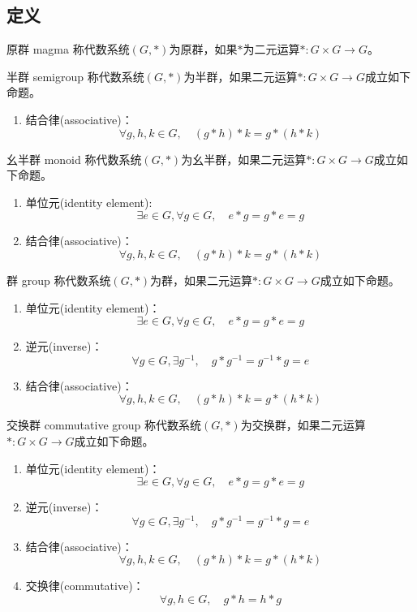 \subsection{定义}

\begin{definition}{原群 magma}
	称代数系统$(G,*)$为原群，如果$*$为二元运算$*:G\times G\to G$。
\end{definition}

\begin{definition}{半群 semigroup}
	称代数系统$(G,*)$为半群，如果二元运算$*:G\times G\to G$成立如下命题。
	\begin{enumerate}
		\item 结合律(associative)：
		$$
		\forall g,h,k\in G,\quad (g*h)*k=g*(h*k)
		$$
	\end{enumerate}
\end{definition}

\begin{definition}{幺半群 monoid}
	称代数系统$(G,*)$为幺半群，如果二元运算$*:G\times G\to G$成立如下命题。
	\begin{enumerate}
		\item 单位元(identity element):
		$$
		\exists e\in G,\forall g\in G,\quad e*g=g*e=g
		$$
		\item 结合律(associative)：
		$$
		\forall g,h,k\in G,\quad (g*h)*k=g*(h*k)
		$$
	\end{enumerate}
\end{definition}

\begin{definition}{群 group}
	称代数系统$(G,*)$为群，如果二元运算$*:G\times G\to G$成立如下命题。
	\begin{enumerate}
		\item 单位元(identity element)：
		$$
		\exists e\in G,\forall g\in G,\quad e*g=g*e=g
		$$
		\item 逆元(inverse)：$$
		\forall g\in G,\exists g^{-1},\quad g*g^{-1}=g^{-1}*g=e
		$$
		\item 结合律(associative)：
		$$
		\forall g,h,k\in G,\quad (g*h)*k=g*(h*k)
		$$
	\end{enumerate}
\end{definition}

\begin{definition}{交换群 commutative group}
	称代数系统$(G,*)$为交换群，如果二元运算$*:G\times G\to G$成立如下命题。
	\begin{enumerate}
		\item 单位元(identity element)：
		$$
		\exists e\in G,\forall g\in G,\quad e*g=g*e=g
		$$
		\item 逆元(inverse)：$$
		\forall g\in G,\exists g^{-1},\quad g*g^{-1}=g^{-1}*g=e
		$$
		\item 结合律(associative)：
		$$
		\forall g,h,k\in G,\quad (g*h)*k=g*(h*k)
		$$
		\item 交换律(commutative)：
		$$
		\forall g,h\in G,\quad g*h=h*g
		$$
	\end{enumerate}
\end{definition}

